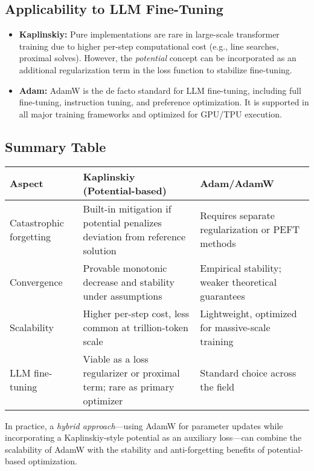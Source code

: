 \documentclass[12pt]{article}
\begin{document}
\subsection{Applicability to LLM Fine-Tuning}
\begin{itemize}
    \item \textbf{Kaplinskiy:} Pure implementations are rare in large-scale transformer training due to higher per-step computational cost (e.g., line searches, proximal solves). However, the \emph{potential} concept can be incorporated as an additional regularization term in the loss function to stabilize fine-tuning.
    \item \textbf{Adam:} AdamW is the de facto standard for LLM fine-tuning, including full fine-tuning, instruction tuning, and preference optimization. It is supported in all major training frameworks and optimized for GPU/TPU execution.
\end{itemize}

\subsection{Summary Table}
\begin{center}
\begin{tabular}{|l|p{5cm}|p{5cm}|}
\hline
\textbf{Aspect} & \textbf{Kaplinskiy (Potential-based)} & \textbf{Adam/AdamW} \\
\hline
Catastrophic forgetting & Built-in mitigation if potential penalizes deviation from reference solution & Requires separate regularization or PEFT methods \\
\hline
Convergence & Provable monotonic decrease and stability under assumptions & Empirical stability; weaker theoretical guarantees \\
\hline
Scalability & Higher per-step cost, less common at trillion-token scale & Lightweight, optimized for massive-scale training \\
\hline
LLM fine-tuning & Viable as a loss regularizer or proximal term; rare as primary optimizer & Standard choice across the field \\
\hline
\end{tabular}
\end{center}

In practice, a \emph{hybrid approach}---using AdamW for parameter updates while incorporating a Kaplinskiy-style potential as an auxiliary loss---can combine the scalability of AdamW with the stability and anti-forgetting benefits of potential-based optimization.
\end{document}
